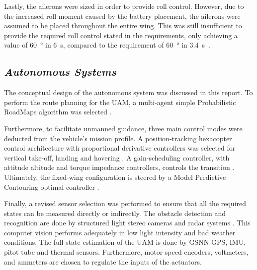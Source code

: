 Lastly, the ailerons were sized in order to provide roll control.
However, due to the increased roll moment caused by the battery placement, the ailerons were assumed to be placed throughout the entire wing.
This was still insufficient to provide the required roll control stated in the requirements, only achieving a value of \qty{60}{\degree} in \qty{6}{\s}, compared to the requirement of \qty{60}{\degree} in \qty{3.4}{\s}~\cite{roll_requirement}.


\subsection*{\textit{Autonomous Systems}}
The conceptual design of the autonomous system was discussed in this report.
To perform the route planning for the UAM, a multi-agent simple Probabilistic RoadMaps algorithm was selected \cite{PRM,todays_traveling_salesman}.

Furthermore, to facilitate unmanned guidance, three main control modes were deducted from the vehicle’s mission profile.
A position-tracking hexacopter control architecture with proportional derivative controllers was selected for vertical take-off, landing and hovering \cite{quadcopter_control_allocation}.
A gain-scheduling controller, with attitude
altitude and torque impedance controllers, controls the transition \cite{transition_control}.
Ultimately, the fixed-wing configuration is steered by a Model Predictive Contouring optimal controller \cite{MPC_justification,MPCC}.

Finally, a revised sensor selection was performed to ensure that all the required states can be measured directly or indirectly.
The obstacle detection and recognition are done by structured light stereo cameras and radar systems \cite{structured_light}.
This computer vision performs adequately in low light intensity and bad weather conditions.
The full state estimation of the UAM is done by GSNN GPS, IMU, pitot tube and thermal sensors.
Furthermore, motor speed encoders, voltmeters, and ammeters are chosen to regulate the inputs of the actuators.

